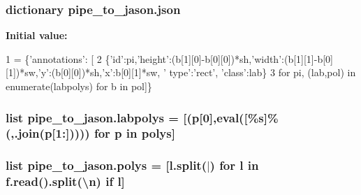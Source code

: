 \subsubsection[{json}]{\setlength{\rightskip}{0pt plus 5cm}dictionary pipe\+\_\+to\+\_\+jason.\+json}\label{namespacepipe__to__jason_a33ac92a87429be717ae3a29102c9d3a8}
{\bfseries Initial value\+:}
\begin{DoxyCode}
1 = \{\textcolor{stringliteral}{'annotations'}: [
2     \{\textcolor{stringliteral}{'id'}:pi,\textcolor{stringliteral}{'height'}:(b[1][0]-b[0][0])*sh,\textcolor{stringliteral}{'width'}:(b[1][1]-b[0][1])*sw,\textcolor{stringliteral}{'y'}:(b[0][0])*sh,\textcolor{stringliteral}{'x'}:b[0][1]*sw, \textcolor{stringliteral}{'
      type'}:\textcolor{stringliteral}{'rect'}, \textcolor{stringliteral}{'class'}:lab\}
3     \textcolor{keywordflow}{for} pi, (lab,pol) \textcolor{keywordflow}{in} enumerate(labpolys) \textcolor{keywordflow}{for} b \textcolor{keywordflow}{in} pol]\}
\end{DoxyCode}
\hypertarget{namespacepipe__to__jason_a1b1f06e543adff6eecc4e0e4264104f5}{}
\subsubsection[{labpolys}]{\setlength{\rightskip}{0pt plus 5cm}list pipe\+\_\+to\+\_\+jason.\+labpolys = \mbox{[}(p\mbox{[}0\mbox{]},eval(\textquotesingle{}\mbox{[}\%s\mbox{]}\textquotesingle{}\%(\textquotesingle{},\textquotesingle{}.join(p\mbox{[}1\+:\mbox{]})))) for p in {\bf polys}\mbox{]}}\label{namespacepipe__to__jason_a1b1f06e543adff6eecc4e0e4264104f5}
\hypertarget{namespacepipe__to__jason_a46919de99c7927437b5ad68cec346b4b}{}
\subsubsection[{polys}]{\setlength{\rightskip}{0pt plus 5cm}list pipe\+\_\+to\+\_\+jason.\+polys = \mbox{[}l.\+split(\textquotesingle{}$\vert$\textquotesingle{}) for l in f.\+read().split(\textquotesingle{}\textbackslash{}n\textquotesingle{}) if l\mbox{]}}\label{namespacepipe__to__jason_a46919de99c7927437b5ad68cec346b4b}
\hypertarget{namespacepipe__to__jason_a50a7efe9831d8c4b8594f0f74fbb583b}{}
